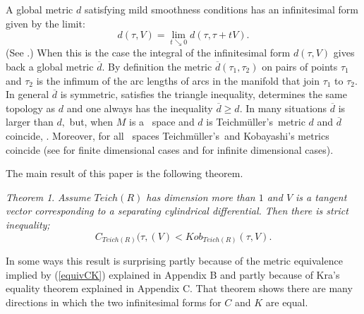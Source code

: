 \documentclass[12pt]{amsart}
\newcommand{\tes}{Teich\-m\"ul\-ler's}
\theoremstyle{remark}
\newtheorem{theorem}{Theorem}
\theoremstyle{definition}
\theoremstyle{definition}
\begin{document}
\begin{section}
 
 
 
\bigskip
 
 
 
  A global metric $d$  satisfying mild smoothness conditions  has an infinitesimal form  given by the limit:
 $$ d(\tau,V) = \lim_{t \searrow 0} d(\tau,\tau+tV).$$
 (See \cite{EarleHarrisHubbardMitra}.)
  When this is the case the integral of the infinitesimal form $d(\tau, V)$  gives back a global metric 
  $\overline{d}.$   By definition the metric $\overline{d}(\tau_1,\tau_2)$ on pairs of points $\tau_1$ and $\tau_2$  is the infimum of the arc lengths of arcs in the manifold that join 
  $\tau_1$ to $\tau_2.$    In general  
  $\overline{d}$ is symmetric, satisfies the triangle inequality, determines the same topology as $d$ and one always has the inequality
  $\overline{d} \geq d.$  In many situations $\overline{d}$ is larger than $d,$ 
  but, when $M$ is a \te\ space and $d$ is \tes\ metric $d$ and $\overline{d}$ coincide, \cite{EarleEells} \cite{OByrne}.  Moreover,  for all \te\ spaces \tes\ and Kobayashi's metrics coincide 
  (see \cite{Royden} for finite dimensional cases and  \cite{Gardiner3, Gardinerbook} for  infinite dimensional cases).


 
The main result  of this paper is the following theorem.
\begin{theorem}\label{maintheorem} {\it Assume  $Teich(R)$ has dimension more than $1$ and  $V$ is a tangent vector corresponding to a separating cylindrical differential.  Then there is strict inequality;}
\begin{equation}\label{inequality}
C_{Teich(R)}(\tau,(V) < Kob_{Teich(R)}(\tau,V).
\end{equation}
\end{theorem}

\vspace{.1in} 

In some ways this result is surprising partly because of  the metric equivalence implied by (\ref{equivCK}) explained in Appendix B  and partly because of  Kra's equality theorem \cite{Kra1} explained in Appendix C. That theorem shows there are many directions
in which the two infinitesimal forms for $C$ and $K$ are equal.  


\end{section}
\end{document}
